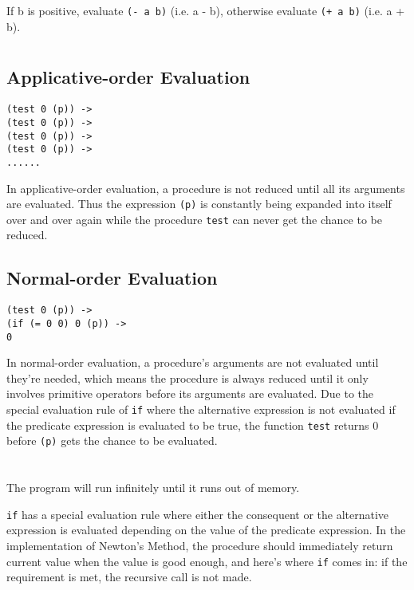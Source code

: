 \documentclass[../main.tex]{subfiles}
\begin{document}
If b is positive, evaluate \lstinline{(- a b)} (i.e. a - b), otherwise evaluate \lstinline{(+ a b)} (i.e. a + b).


\section{}

\subsection*{Applicative-order Evaluation}

\begin{lstlisting}
(test 0 (p)) ->
(test 0 (p)) ->
(test 0 (p)) ->
(test 0 (p)) ->
......
\end{lstlisting}

In applicative-order evaluation, a procedure is not reduced until all its arguments are evaluated. Thus the expression \lstinline{(p)} is constantly being expanded into itself over and over again while the procedure \lstinline{test} can never get the chance to be reduced.

\subsection*{Normal-order Evaluation}

\begin{lstlisting}
(test 0 (p)) ->
(if (= 0 0) 0 (p)) ->
0
\end{lstlisting}

In normal-order evaluation, a procedure's arguments are not evaluated until they're needed, which means the procedure is always reduced until it only involves primitive operators before its arguments are evaluated. Due to the special evaluation rule of \lstinline{if} where the alternative expression is not evaluated if the predicate expression is evaluated to be true, the function \lstinline{test} returns 0 before \lstinline{(p)} gets the chance to be evaluated.


\section{}

The program will run infinitely until it runs out of memory.

\lstinline{if} has a special evaluation rule where either the consequent or the alternative expression is evaluated depending on the value of the predicate expression. In the implementation of Newton's Method, the procedure should immediately return current value when the value is good enough, and here's where \lstinline{if} comes in: if the requirement is met, the recursive call is not made.
 
\end{document}
